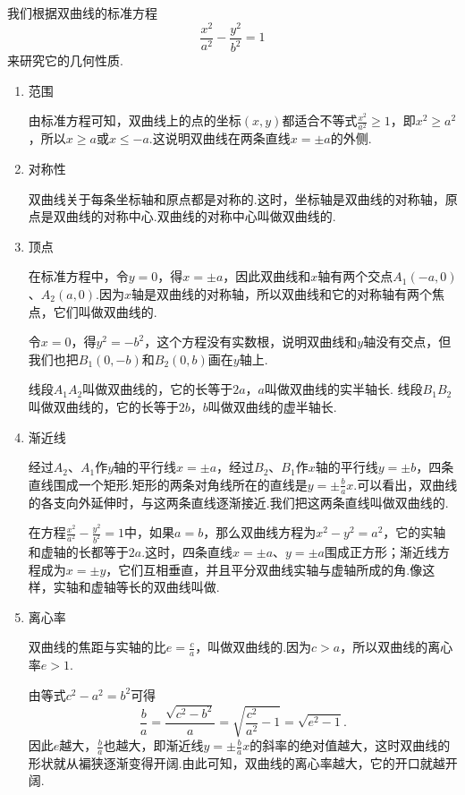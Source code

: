 我们根据双曲线的标准方程\[
\frac{x^2}{a^2} - \frac{y^2}{b^2} = 1
\]来研究它的几何性质.
\begin{enumerate}
\item 范围

由标准方程可知，双曲线上的点的坐标\((x,y)\)都适合不等式\(\frac{x^2}{a^2}\geq1\)，即\(x^2 \geq a^2\)，所以\(x \geq a\)或\(x \leq -a\).这说明双曲线在两条直线\(x = \pm a\)的外侧.

\item 对称性

双曲线关于每条坐标轴和原点都是对称的.这时，坐标轴是双曲线的对称轴，原点是双曲线的对称中心.双曲线的对称中心叫做双曲线的.

\item 顶点

在标准方程中，令\(y=0\)，得\(x = \pm a\)，因此双曲线和\(x\)轴有两个交点\(A_1(-a,0)\)、\(A_2(a,0)\).因为\(x\)轴是双曲线的对称轴，所以双曲线和它的对称轴有两个焦点，它们叫做双曲线的.

令\(x=0\)，得\(y^2=-b^2\)，这个方程没有实数根，说明双曲线和\(y\)轴没有交点，但我们也把\(B_1(0,-b)\)和\(B_2(0,b)\)画在\(y\)轴上.

线段\(A_1 A_2\)叫做双曲线的，它的长等于\(2a\)，\(a\)叫做双曲线的实半轴长.
线段\(B_1 B_2\)叫做双曲线的，它的长等于\(2b\)，\(b\)叫做双曲线的虚半轴长.

\item 渐近线

经过\(A_2\)、\(A_1\)作\(y\)轴的平行线\(x = \pm a\)，经过\(B_2\)、\(B_1\)作\(x\)轴的平行线\(y = \pm b\)，四条直线围成一个矩形.矩形的两条对角线所在的直线是\(y = \pm\frac{b}{a}x\).可以看出，双曲线的各支向外延伸时，与这两条直线逐渐接近.我们把这两条直线叫做双曲线的.

在方程\(\frac{x^2}{a^2}-\frac{y^2}{b^2}=1\)中，如果\(a=b\)，那么双曲线方程为\(x^2-y^2=a^2\)，它的实轴和虚轴的长都等于\(2a\).这时，四条直线\(x=\pm a\)、\(y=\pm a\)围成正方形；渐近线方程成为\(x=\pm y\)，它们互相垂直，并且平分双曲线实轴与虚轴所成的角.像这样，实轴和虚轴等长的双曲线叫做.

\item 离心率

双曲线的焦距与实轴的比\(e = \frac{c}{a}\)，叫做双曲线的.因为\(c > a\)，所以双曲线的离心率\(e > 1\).

由等式\(c^2-a^2=b^2\)可得\[
\frac{b}{a} = \frac{\sqrt{c^2-b^2}}{a} = \sqrt{\frac{c^2}{a^2}-1} = \sqrt{e^2-1}.
\]因此\(e\)越大，\(\frac{b}{a}\)也越大，即渐近线\(y = \pm\frac{b}{a}x\)的斜率的绝对值越大，这时双曲线的形状就从褊狭逐渐变得开阔.由此可知，双曲线的离心率越大，它的开口就越开阔.
\end{enumerate}

